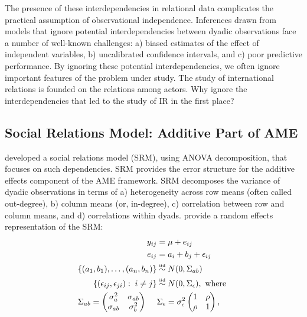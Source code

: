 \documentclass[12pt]{amsart}
\newcommand\simiid{\stackrel{\mathclap{\normalfont\mbox{\tiny{iid}}}}{\sim}}\usepackage{natbib}
\begin{document}
The presence of these interdependencies in relational data complicates the practical assumption of observational independence.  Inferences drawn from models that ignore potential interdependencies between dyadic observations face a number of well-known challenges: a) biased estimates of the effect of independent variables, b) uncalibrated confidence intervals, and c) poor predictive performance. By ignoring these potential interdependencies, we often ignore important features of the problem under study. The study of international relations is founded on the relations among actors. Why ignore the interdependencies that led to the study of IR in the first place?

\subsection{\textbf{Social Relations Model: Additive Part of AME}}

\citet{warner:etal:1979} developed a social relations model (SRM), using ANOVA decomposition, that focuses on such dependencies. SRM provides the error structure for the additive effects component of the AME framework. SRM decomposes the variance of dyadic observations in terms of a) heterogeneity across row means (often called out-degree), b) column means (or, in-degree), c) correlation between row and column means, and d) correlations within dyads.  \citet{wong:1982,li:loken:2002} provide a random effects representation of the SRM:
\begin{align}
\begin{aligned}
	y_{ij} &= \mu + e_{ij} \\
	e_{ij} &= a_{i} + b_{j} + \epsilon_{ij} \\
	\{ (a_{1}, b_{1}), \ldots, (a_{n}, b_{n}) \} &\simiid N(0,\Sigma_{ab}) \\ 
	\{ (\epsilon_{ij}, \epsilon_{ji}) : \; i \neq j\} &\simiid N(0,\Sigma_{\epsilon}), \text{ where } \\
	\Sigma_{ab} = \begin{pmatrix} \sigma_{a}^{2} & \sigma_{ab} \\ \sigma_{ab} & \sigma_{b}^2   \end{pmatrix} \;\;\;\;\; &\Sigma_{\epsilon} = \sigma_{\epsilon}^{2} \begin{pmatrix} 1 & \rho \\ \rho & 1  \end{pmatrix},
\label{eqn:srmCov}
\end{aligned}
\end{align}
\end{document}
